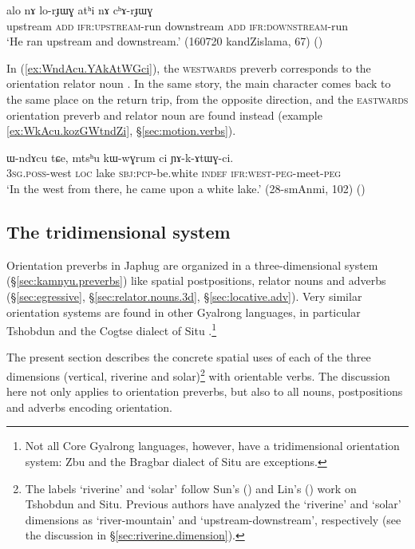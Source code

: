 \begin{exe}
	\ex \label{ex:alo.lorJWG.athi.chArJWG}
	\gll alo nɤ lo-rɟɯɣ atʰi nɤ cʰɤ-rɟɯɣ \\
	upstream \textsc{add} \textsc{ifr}:\textsc{upstream}-run 	downstream \textsc{add} \textsc{ifr}:\textsc{downstream}-run  \\
	\glt `He ran upstream and downstream.' (160720 kandZislama, 67)
()
\end{exe}

In (\ref{ex:WndAcu.YAkAtWGci}), the \textsc{westwards}  preverb corresponds to the orientation relator noun . In the same story, the main character comes back to the same place on the return trip, from the opposite direction, and the \textsc{eastwards} orientation preverb and relator noun are found instead (example \ref{ex:WkAcu.kozGWtndZi}, §\ref{sec:motion.verbs}).


\begin{exe}
	\ex \label{ex:WndAcu.YAkAtWGci}
	\gll ɯ-ndɤcu tɕe, mtsʰu kɯ-wɣrum ci ɲɤ-k-ɤtɯɣ-ci. \\
	\textsc{3sg}.\textsc{poss}-west \textsc{loc} lake \textsc{sbj}:\textsc{pcp}-be.white \textsc{indef} \textsc{ifr}:\textsc{west}-\textsc{peg}-meet-\textsc{peg} \\
	\glt `In the west from there, he came upon a white lake.' (28-smAnmi, 102) ()
\end{exe}

 
\subsection{The tridimensional system} \label{sec:tridimensional.preverb}
Orientation preverbs in Japhug are organized in a three-dimensional system (§\ref{sec:kamnyu.preverbs}) like spatial postpositions, relator nouns and adverbs (§\ref{sec:egressive}, §\ref{sec:relator.nouns.3d}, §\ref{sec:locative.adv}). Very similar orientation systems are found in other Gyalrong languages, in particular Tshobdun \citep{jackson00sidaba} and the Cogtse dialect of Situ \citep{linxr93jiarong, lin02dimension, linyj17space}.\footnote{Not all Core Gyalrong languages, however, have a tridimensional orientation system: Zbu \citep{gong18these} and the Bragbar dialect of Situ \citep{zhangshuya20these} are exceptions.} 

The present section describes the concrete spatial uses of each of the three dimensions (vertical, riverine and solar)\footnote{The labels `riverine' and `solar' follow  Sun's (\citeyear{jackson00sidaba}) and Lin's (\citeyear{lin02dimension}) work on Tshobdun and Situ. Previous authors \citep{linxr93jiarong} have analyzed the `riverine' and `solar' dimensions as `river-mountain' and `upstream-downstream', respectively (see the discussion in §\ref{sec:riverine.dimension}).  } with orientable verbs. The discussion here not only applies to orientation preverbs, but also to all nouns, postpositions and adverbs encoding orientation.

